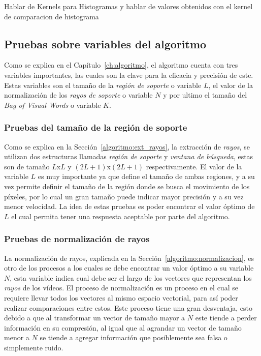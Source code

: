 Hablar de Kernels para Histogramas y hablar de valores obtenidos con el kernel de comparacion de histograma


\subsection{Pruebas sobre variables del algoritmo}
\label{exp:var}
Como se explica en el Capítulo~\ref{ch:algoritmo}, el algoritmo cuenta con tres variables importantes, las cuales son la clave para la eficacia y precisión de este. Estas variables son el tamaño de la \textit{región de soporte} o variable $L$, el valor de la normalización de los \textit{rayos de soporte} o variable $N$ y por ultimo el tamaño del \textit{Bag of Visual Words} o variable $K$.

\subsubsection{Pruebas del tamaño de la región de soporte}
Como se explica en la Sección~\ref{algoritmo:ext_rayos}, la extracción de \textit{rayos}, se utilizan dos estructuras llamadas \textit{región de soporte} y \textit{ventana de búsqueda}, estas son de tamaño $L$x$L$ y $(2L+1)$x$(2L+1)$ respectivamente. El valor de la variable $L$ es muy importante ya que define el tamaño de ambas regiones, y a su vez permite definir el tamaño de la región donde se busca el movimiento de los píxeles, por lo cual un gran tamaño puede indicar mayor precisión y a su vez menor velocidad. La idea de estas pruebas es poder encontrar el valor óptimo de $L$ el cual permita tener una respuesta aceptable por parte del algoritmo. 

\subsubsection{Pruebas de normalización de rayos}	

La normalización de rayos, explicada en la Sección~\ref{algoritmo:normalizacion}, es otro de los procesos a los cuales se debe encontrar un valor óptimo a su variable $N$, esta variable indica cual debe ser el largo de los vectores que representan los \textit{rayos} de los vídeos. El proceso de normalización es un proceso en el cual se requiere llevar todos los vectores al mismo espacio vectorial, para así poder realizar comparaciones entre estos. Este proceso tiene una gran desventaja, esto debido a que al transformar un vector de tamaño mayor a $N$ este tiende a perder información en su compresión, al igual que al agrandar un vector de tamaño menor a $N$ se tiende a agregar información que posiblemente sea falsa o simplemente ruido.


